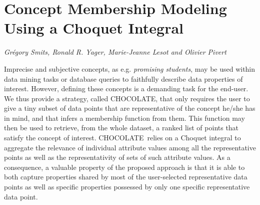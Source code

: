 \documentclass[../booklet.tex]{subfiles}
\begin{document}
\section[Concept Membership Modeling Using a Choquet Integral. {\it Grégory Smits, Ronald R. Yager, Marie-Jeanne Lesot and Olivier Pivert}]{Concept Membership Modeling Using a Choquet Integral}
   

\begin{center}
  {\it Grégory Smits, Ronald R. Yager, Marie-Jeanne Lesot and Olivier Pivert}
\end{center}

\vskip 0.8cm

\newcommand{\nom}{CHOCOLATE}

  Imprecise and subjective concepts, as e.g. {\it promising students}, 
  may be used within data mining tasks or database queries to faithfully describe
  data properties of interest.
  However, defining these concepts is a demanding task for
  the end-user. We thus provide a strategy, called \nom, that
  only requires the user to give a tiny subset of data points that
  are representative of the concept he/she has in mind, and that
  infers a membership function from them. This function may then be
  used to retrieve, from the whole dataset, a ranked list of points that satisfy the concept of interest. \nom\ relies on a
  Choquet integral to aggregate the relevance of individual attribute
  values among all the representative points as well as the
  representativity of sets of such attribute values.  As a
  consequence, a valuable property of the proposed approach is that it
  is able to both capture properties shared by most of the
  user-selected representative data points as well as specific
  properties possessed by only one specific representative data point.
\end{document}
